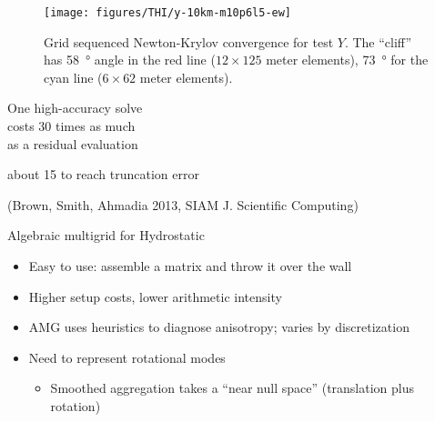 \documentclass{beamer}
\begin{document}



\begin{frame}
  \begin{figure}
    \texttt{[image: figures/THI/y-10km-m10p6l5-ew]}
    \centering\caption{Grid sequenced Newton-Krylov convergence for test $Y$.
    The ``cliff'' has \SI{58}{\degree} angle in the red line ($12\times 125$ meter elements), \SI{73}{\degree} for the cyan line ($6\times 62$ meter elements).}\label{fig:testy}
  \end{figure}
\end{frame}

\begin{frame}
  \begin{center}
    \alert{\huge One high-accuracy solve \\[0.2em]
      costs 30 times as much \\[0.5em]
      as a residual evaluation}
  \end{center}
  \begin{center}
    about 15 to reach truncation error

    \bigskip

    
    \bigskip

    {(Brown, Smith, Ahmadia 2013, SIAM J. Scientific Computing)}
  \end{center}
\end{frame}
\begin{frame}{Algebraic multigrid for Hydrostatic}
  \begin{itemize}
  \item Easy to use: assemble a matrix and throw it over the wall
  \item Higher setup costs, lower arithmetic intensity
  \item AMG uses heuristics to diagnose anisotropy; varies by discretization
  \item Need to represent rotational modes
    \begin{itemize}
    \item Smoothed aggregation takes a ``near null space'' (translation plus rotation)
    \end{itemize}
  \end{itemize}
\end{frame}

\end{document}
